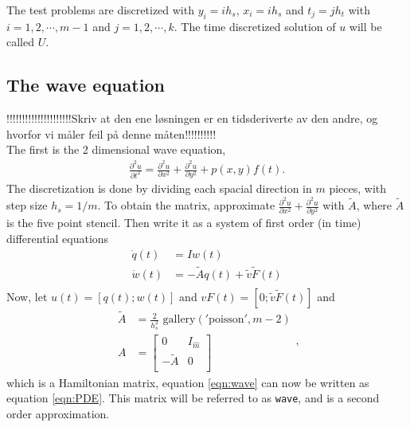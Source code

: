 The test problems are discretized with $y_i = i h_s$, $x_i = i h_s$ and $t_j = j h_t$ with $i = 1,2,\cdots,m-1 $ and $ j = 1,2,\cdots,k $. The time discretized solution of $u$ will be called $U$.

\subsection{The wave equation} %
!!!!!!!!!!!!!!!!!!!!!Skriv at den ene løsningen er en tidsderiverte av den andre, og hvorfor vi måler feil på denne måten!!!!!!!!!!\\

The first is the 2 dimensional wave equation, 
\begin{equation}
\begin{aligned}
\frac{\partial^2 u}{\partial t^2} = \frac{\partial^2 u}{\partial x^2}+ \frac{\partial^2 u}{\partial y^2} + p(x,y)f(t).
\end{aligned}
\label{eqn:wave}
\end{equation}
The discretization is done by dividing each spacial direction in $m$ pieces, with step size $h_s = 1/m$.
To obtain the matrix, approximate $\frac{\partial^2 u}{\partial x^2}+ \frac{\partial^2 u}{\partial y^2}$ with $\tilde{A}$, where $\tilde{A}$ is the five point stencil\cite{fivepoint}. Then write it as a system of first order (in time) differential equations
\begin{equation}
\begin{aligned}
\dot{q}(t) &= I w(t) \\
\dot{w}(t) & = -\tilde{A} q(t) + \tilde{v} \tilde{F}(t) \\
\end{aligned}
\end{equation}
Now, let $u(t) = [q(t);w(t)]$ and $ v F(t) =[0; \tilde{v} \tilde{F}(t)] $ and
\begin{equation}
\begin{aligned}
\tilde{A} &= \frac{2}{h_s^2} \text{ gallery}('\text{poisson}', m-2) \\
A &= 
\begin{bmatrix}
 0 & I_{\hat{m}} \\ - \tilde{A} & 0 \\
\end{bmatrix}
\end{aligned},
\end{equation}
which is a Hamiltonian matrix, equation \eqref{eqn:wave} can now be written as equation \eqref{eqn:PDE}. This matrix will be referred to as \texttt{wave}, and is a second order approximation.

